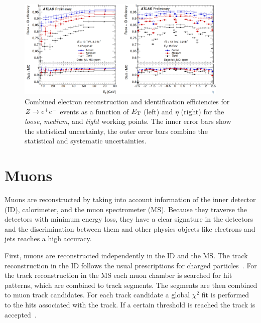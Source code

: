 \begin{figure}[htb]
    \begin{center}
        \includegraphics[width=0.9\textwidth]{./figures/object_selection/el_id_eff.png}
        \caption{Combined electron reconstruction and identification efficiencies for $Z \to e^+e^-$ events as a
                 function of $E_\text{T}$ (left) and $\eta$ (right) for the \emph{loose}, \emph{medium}, and \emph{tight}
                 working points. The inner error bars show the statistical uncertainty, the outer error bars combine
                 the statistical and systematic uncertainties.~\cite{ATLAS-CONF-2016-024}}\label{fig:object_selection:el_id_eff}
    \end{center}
\end{figure}

\section{Muons}\label{sec:object_selection:muons}

Muons are reconstructed by taking into account information of the inner detector (ID), calorimeter, and the
muon spectrometer (MS).
Because  they traverse the detectors with minimum energy loss, they have a clear signature in the detectors and the
discrimination between them and other physics objects like electrons and jets reaches a high accuracy.

First, muons are reconstructed independently in the ID and the MS\@. The track reconstruction in the ID follows the
usual prescriptions for charged particles~\cite{ATL-SOFT-PUB-2007-007,ATLAS-CONF-2010-072}.
For the track reconstruction in the MS each muon chamber is searched for hit patterns, which are combined to track
segments. The segments are then combined to muon track candidates. For each track candidate a global $\chi^2$ fit
is performed to the hits associated with the track. If a certain threshold is reached the track is accepted~\cite{PERF-2015-10}.

